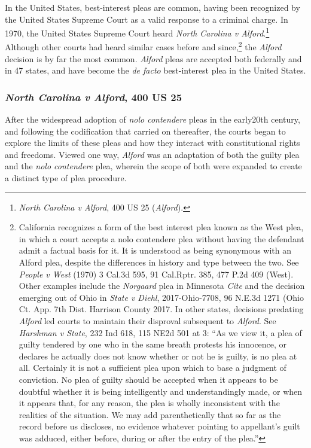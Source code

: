 In the United States, best-interest pleas are common, having been recognized by the United States Supreme Court as a valid response to a criminal charge. In 1970, the United States Supreme Court heard \textit{North Carolina v Alford}.\footnote{\textit{North Carolina v Alford}, 400 US 25 (\textit{Alford}).} Although other courts had heard similar cases before and since,\footnote{California recognizes a form of the best interest plea known as the West plea, in which a court accepts a nolo contendere plea without having the defendant admit a factual basis for it. It is understood as being synonymous with an Alford plea, despite the differences in history and type between the two. See \textit{People v West} (1970) 3 Cal.3d 595, 91 Cal.Rptr. 385, 477 P.2d 409 (West). Other examples include the \textit{Norgaard} plea in Minnesota \textit{Cite} and the decision emerging out of Ohio in \textit{State v Diehl}, 2017-Ohio-7708, 96 N.E.3d 1271 (Ohio Ct. App. 7th Dist. Harrison County 2017. In other states, decisions predating \textit{Alford} led courts to maintain their disproval subsequent to \textit{Alford}. See \textit{Harshman v State}, 232 Ind 618, 115 NE2d 501 at 3: ``As we view it, a plea of guilty tendered by one who in the same breath protests his innocence, or declares he actually does not know whether or not he is guilty, is no plea at all. Certainly it is not a sufficient plea upon which to base a judgment of conviction. No plea of guilty should be accepted when it appears to be doubtful whether it is being intelligently and understandingly made, or when it appears that, for any reason, the plea is wholly inconsistent with the realities of the situation. We may add parenthetically that so far as the record before us discloses, no evidence whatever pointing to appellant's guilt was adduced, either before, during or after the entry of the plea.''} the \textit{Alford} decision is by far the most common. \textit{Alford} pleas are accepted both federally and in 47 states, and have become the \textit{de facto} best-interest plea in the United States.

\subsubsection{\textit{North Carolina v Alford}, 400 US 25}

After the widespread adoption of \textit{nolo contendere} pleas in the early20th century, and following the codification that carried on thereafter, the courts began to explore the limits of these pleas and how they interact with constitutional rights and freedoms. Viewed one way, \textit{Alford} was an adaptation of both the guilty plea and the \textit{nolo contendere} plea, wherein the scope of both were expanded to create a distinct type of plea procedure.

